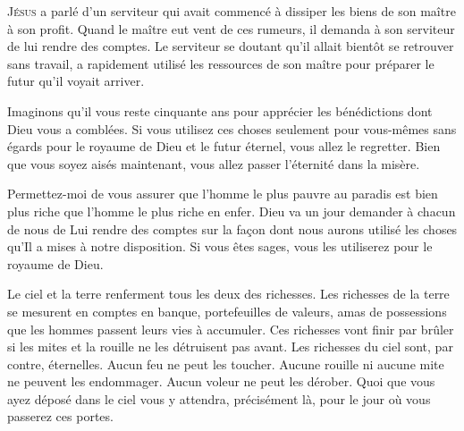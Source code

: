 \lettrine{J}{ésus} a parlé d'un serviteur qui avait commencé
 à dissiper les biens de son maître à son profit.
 Quand le maître eut vent de ces rumeurs, il demanda à son serviteur
 de lui rendre des comptes. Le serviteur se doutant qu'il allait bientôt
 se retrouver sans travail, a rapidement utilisé les ressources
 de son maître pour préparer le futur qu'il voyait arriver.

Imaginons qu'il vous reste cinquante ans pour apprécier les bénédictions
 dont Dieu vous a comblées. Si vous utilisez ces choses seulement
 pour vous-mêmes sans égards pour le royaume de Dieu et le futur éternel,
 vous allez le regretter. Bien que vous soyez aisés maintenant,
 vous allez passer l'éternité dans la misère.

Permettez-moi de vous assurer que l'homme le plus pauvre au paradis
 est bien plus riche que l'homme le plus riche en enfer.
 Dieu va un jour demander à chacun de nous de Lui rendre des comptes
 sur la façon dont nous aurons utilisé les choses qu'Il a mises
 à notre disposition. Si vous êtes sages,
 vous les utiliserez pour le royaume de Dieu.

Le ciel et la terre renferment tous les deux des richesses.
 Les richesses de la terre se mesurent en comptes en banque,
 portefeuilles de valeurs, amas de possessions que les hommes passent
 leurs vies à accumuler. Ces richesses vont finir par brûler si les mites
 et la rouille ne les détruisent pas avant. Les richesses du ciel sont,
 par contre, éternelles. Aucun feu ne peut les toucher.
 Aucune rouille ni aucune mite ne peuvent les endommager.
 Aucun voleur ne peut les dérober. Quoi que vous ayez déposé dans le ciel
 vous y attendra, précisément là, pour le jour où vous passerez ces portes.


\dvrule






